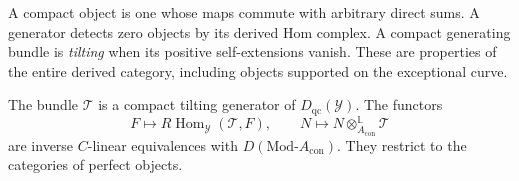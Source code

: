 A compact object is one whose maps commute with arbitrary direct
sums. A generator detects zero objects by its derived Hom complex.
A compact generating bundle is \emph{tilting} when its positive
self-extensions vanish. These are properties of the entire derived
category, including objects supported on the exceptional curve.

\begin{theorem}\label{cyrec:thm:conifold-morita}
The bundle $\mathcal T$ is a compact tilting generator of
$D_{\mathrm{qc}}(\mathcal Y)$. The functors
\begin{equation}\label{cyrec:eq:conifold-morita}
 F\longmapsto R\operatorname{Hom}_{\mathcal Y}(\mathcal T,F),
 \qquad
 N\longmapsto N\otimes^{\mathbb L}_{A_{\mathrm{con}}}\mathcal T
\end{equation}
are inverse $C$-linear equivalences with
$D(\mathrm{Mod}\text{-}A_{\mathrm{con}})$.
They restrict to the categories of perfect objects.
\end{theorem}

